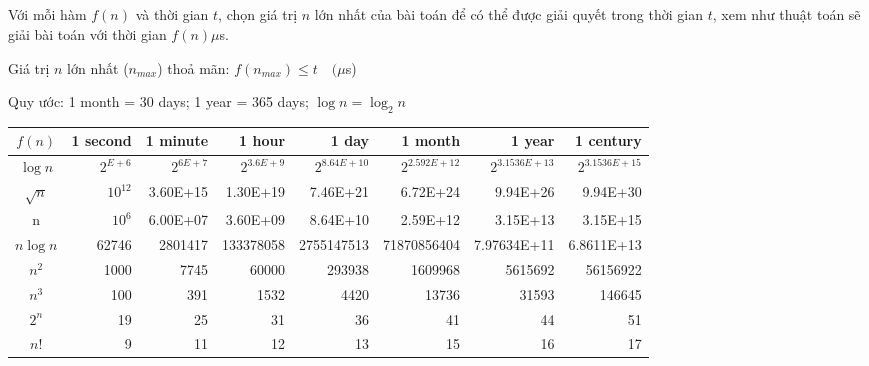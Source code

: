 \subsection{}
Với mỗi hàm $f(n)$ và thời gian $t$, chọn giá trị $n$ lớn nhất của bài toán để có thể được giải quyết trong thời gian $t$, xem như thuật toán sẽ giải bài toán với thời gian $f(n)\mu$s.

Giá trị $n$ lớn nhất ($n_{max}$) thoả mãn: $f(n_{max})\leq t \quad(\mu$s)

Quy ước: 1 month = 30 days; 1 year = 365 days; $\log n = \log_2 n$

\begin{adjustbox}{width=\textwidth, valign=t}
\centering
\begin{tabular}{crrrrrrr}
\toprule
$f(n)$ & 1 second &  1 minute &     1 hour &        1 day &       1 month &         1 year &      1 century \\
\midrule
 $\log n$ &  $2^{E+6}$ &   $2^{6E+7}$ &  $2^{3.6E+9}$ &  $2^{8.64E+10}$ &  $2^{2.592E+12}$ &  $2^{3.1536E+13}$ &  $2^{3.1536E+15}$ \\
 $\sqrt{n}$ &    $10^{12}$ &  3.60E+15 &   1.30E+19 &     7.46E+21 &      6.72E+24 &       9.94E+26 &       9.94E+30 \\
   n &     $10^{6}$ &  6.00E+07 &   3.60E+09 &     8.64E+10 &      2.59E+12 &       3.15E+13 &       3.15E+15 \\
 $n\log n$ &    62746 &   2801417 &  133378058 &   2755147513 &   71870856404 &    7.97634E+11 &     6.8611E+13 \\
   $n^2$ &     1000 &      7745 &      60000 &       293938 &       1609968 &        5615692 &       56156922 \\
    $n^3$ &      100 &       391 &       1532 &         4420 &         13736 &          31593 &         146645 \\
   $2^n$ &       19 &        25 &         31 &           36 &            41 &             44 &             51 \\
      $n!$ &        9 &        11 &         12 &           13 &            15 &             16 &             17 \\
\bottomrule
\end{tabular}
\end{adjustbox}

